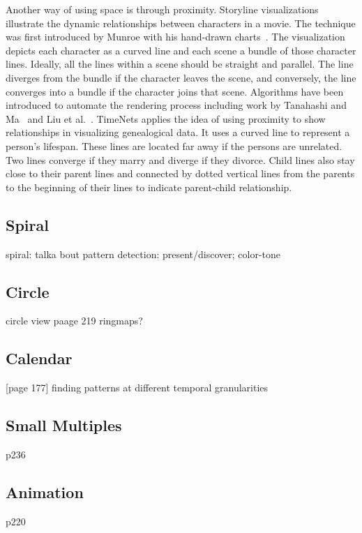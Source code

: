 Another way of using space is through proximity. Storyline visualizations illustrate the dynamic relationships between characters in a movie. The technique was first introduced by Munroe with his hand-drawn charts~\cite{Munroe2009}. The visualization depicts each character as a curved line and each scene a bundle of those character lines. Ideally, all the lines within a scene should be straight and parallel. The line diverges from the bundle if the character leaves the scene, and conversely, the line converges into a bundle if the character joins that scene. Algorithms have been introduced to automate the rendering process including work by Tanahashi and Ma~\cite{Tanahashi2012} and Liu et al.~\cite{Liu2013}. TimeNets applies the idea of using proximity to show relationships in visualizing genealogical data. It uses a curved line to represent a person's lifespan. These lines are located far away if the persons are unrelated. Two lines converge if they marry and diverge if they divorce. Child lines also stay close to their parent lines and connected by dotted vertical lines from the parents to the beginning of their lines to indicate parent-child relationship.

\subsection{Spiral}
spiral: talka bout pattern detection: present/discover;
color-tone
\subsection{Circle}
circle view paage 219 ringmaps?

\subsection{Calendar} [page 177]
finding patterns at different temporal granularities
\subsection{Small Multiples}
p236
\subsection{Animation}
p220